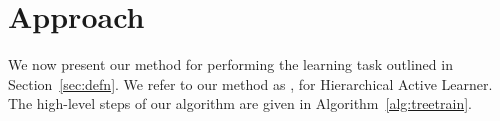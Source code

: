 \documentclass[10pt,conference,compsocconf]{IEEEtran}
\newcommand{\sys}{\Call{Hal}{}} %
\begin{document}
% 
% 

\section{Approach}
\label{sec:approach}

We now present our method for performing the learning task outlined in 
Section~\ref{sec:defn}. 
We refer to our method as \sys , for Hierarchical Active Learner.
The high-level steps
of our algorithm are given in Algorithm~\ref{alg:treetrain}.  
\end{document}
